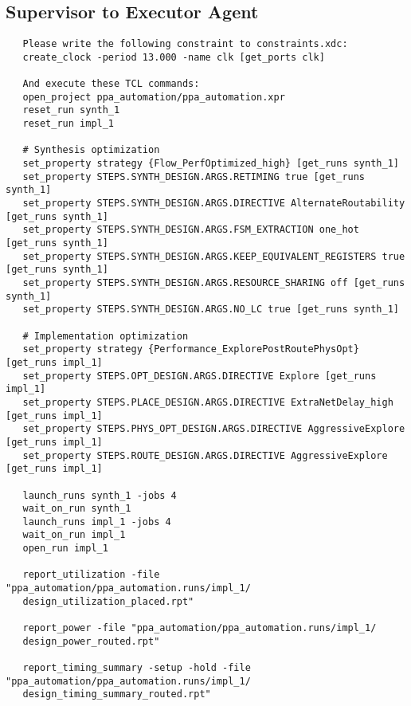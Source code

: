 \subsection{Supervisor to Executor Agent}
\vspace{-0.5em}
\begin{supervisorbox}
\begin{lstlisting}
   Please write the following constraint to constraints.xdc:
   create_clock -period 13.000 -name clk [get_ports clk]
   
   And execute these TCL commands:
   open_project ppa_automation/ppa_automation.xpr
   reset_run synth_1
   reset_run impl_1
   
   # Synthesis optimization
   set_property strategy {Flow_PerfOptimized_high} [get_runs synth_1]
   set_property STEPS.SYNTH_DESIGN.ARGS.RETIMING true [get_runs synth_1]
   set_property STEPS.SYNTH_DESIGN.ARGS.DIRECTIVE AlternateRoutability [get_runs synth_1]
   set_property STEPS.SYNTH_DESIGN.ARGS.FSM_EXTRACTION one_hot [get_runs synth_1]
   set_property STEPS.SYNTH_DESIGN.ARGS.KEEP_EQUIVALENT_REGISTERS true [get_runs synth_1]
   set_property STEPS.SYNTH_DESIGN.ARGS.RESOURCE_SHARING off [get_runs synth_1]
   set_property STEPS.SYNTH_DESIGN.ARGS.NO_LC true [get_runs synth_1]
   
   # Implementation optimization
   set_property strategy {Performance_ExplorePostRoutePhysOpt} [get_runs impl_1]
   set_property STEPS.OPT_DESIGN.ARGS.DIRECTIVE Explore [get_runs impl_1]
   set_property STEPS.PLACE_DESIGN.ARGS.DIRECTIVE ExtraNetDelay_high [get_runs impl_1]
   set_property STEPS.PHYS_OPT_DESIGN.ARGS.DIRECTIVE AggressiveExplore [get_runs impl_1]
   set_property STEPS.ROUTE_DESIGN.ARGS.DIRECTIVE AggressiveExplore [get_runs impl_1]
   
   launch_runs synth_1 -jobs 4
   wait_on_run synth_1
   launch_runs impl_1 -jobs 4
   wait_on_run impl_1
   open_run impl_1
   
   report_utilization -file "ppa_automation/ppa_automation.runs/impl_1/
   design_utilization_placed.rpt"
   
   report_power -file "ppa_automation/ppa_automation.runs/impl_1/
   design_power_routed.rpt"
   
   report_timing_summary -setup -hold -file "ppa_automation/ppa_automation.runs/impl_1/
   design_timing_summary_routed.rpt"
\end{lstlisting}
\end{supervisorbox}

